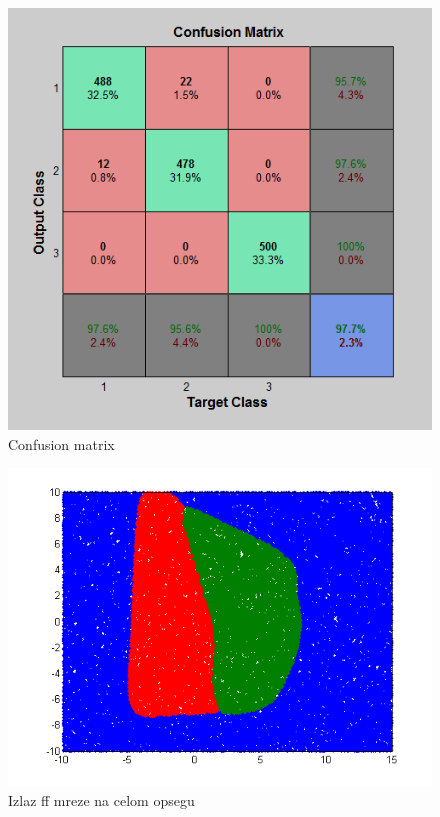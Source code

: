 \documentclass{report}
\begin{document}
\begin{enumerate}
\begin{enumerate}
\begin{figure}[!h]
\begin{center}
\includegraphics[scale=0.7]{B1confussionFF1early.png}
\caption{Confusion matrix}
\end{center}
\end{figure}

\begin{figure}[!h]
\begin{center}
\includegraphics[scale=0.8]{B1outputFF1earlyRandom50000.png}
\caption{Izlaz ff mreze na celom opsegu}
\end{center}
\end{figure}


\end{enumerate}
\end{enumerate}
\end{document}
